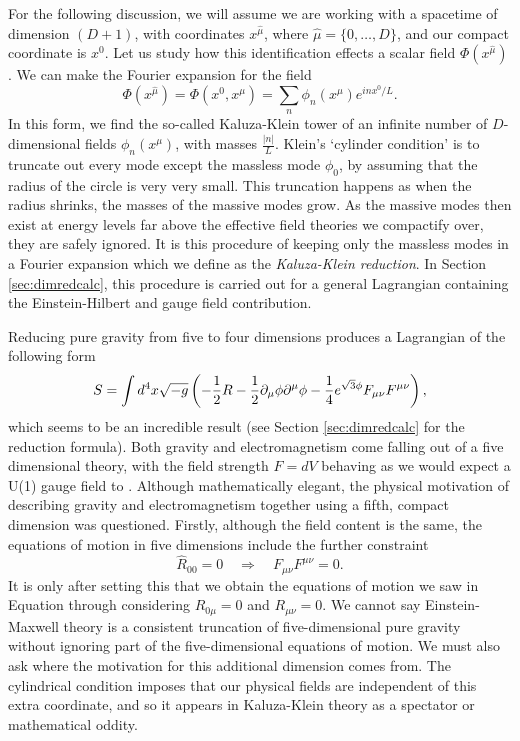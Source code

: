 For the following discussion, we will assume we are working with a spacetime of dimension $(D+1)$, with coordinates $x^{\hat{\mu}}$, where $\hat{\mu} = \{0, \ldots, D\}$, and our compact coordinate is $x^0$. Let us study how this identification effects a scalar field $\Phi(x^{\hat{\mu}})$. We can make the Fourier expansion for the field
\begin{equation*}
	\Phi(x^{\hat{\mu}}) = \Phi(x^0, x^\mu) = \sum_{n} \phi_n (x^\mu) e^{inx^0 / L}.
\end{equation*}
In this form, we find the so-called Kaluza-Klein tower of an infinite number of $D$-dimensional fields $\phi_n(x^\mu)$, with masses $\frac{|n|}{L}$. Klein's `cylinder condition' is to truncate out every mode except the massless mode $\phi_0$, by assuming that the radius of the circle is very very small. This truncation happens as when the radius shrinks, the masses of the massive modes grow. As the massive modes then exist at energy levels far above the effective field theories we compactify over, they are safely ignored. 
It is this procedure of keeping only the massless modes in a Fourier expansion which we define as the \emph{Kaluza-Klein reduction}. In Section \ref{sec:dimredcalc}, this procedure is carried out for a general Lagrangian containing the Einstein-Hilbert and gauge field contribution.

Reducing pure gravity from five to four dimensions produces a Lagrangian of the following form
\begin{equation*}
	S = \int d^4 x \sqrt{-g} \left( -\frac{1}{2} R - \frac{1}{2} \partial_\mu \phi \partial^\mu \phi - \frac{1}{4} e^{\sqrt{3} \phi} F_{\mu \nu} F^{\mu \nu} \right),
\end{equation*}
which seems to be an incredible result (see Section \ref{sec:dimredcalc} for the reduction formula). Both gravity and electromagnetism come falling out of a five dimensional theory, with the field strength $F = dV$ behaving as we would expect a U(1) gauge field to \cite{Errington:2016}. Although mathematically elegant, the physical motivation of describing gravity and electromagnetism together using a fifth, compact dimension was questioned. Firstly, although the field content is the same, the equations of motion in five dimensions include the further constraint \cite{Blau}
\begin{equation*}
	\hat{R}_{00} = 0 \quad \Rightarrow \quad F_{\mu \nu} F^{\mu \nu} = 0.
\end{equation*}
It is only after setting this that we obtain the equations of motion we saw in Equation  through considering $R_{0 \mu} = 0$ and $R_{\mu \nu} = 0$. We cannot say Einstein-Maxwell theory is a consistent truncation of five-dimensional pure gravity without ignoring part of the five-dimensional equations of motion. We must also ask where the motivation for this additional dimension comes from. The cylindrical condition imposes that our physical fields are independent of this extra coordinate, and so it appears in Kaluza-Klein theory as a spectator or mathematical oddity.

